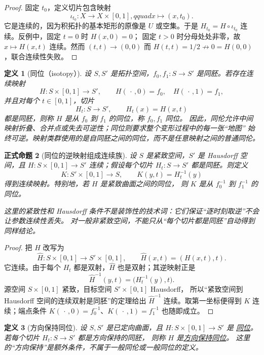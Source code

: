 \documentclass[UTF8,fontset=none,a4paper,11pt]{ctexart}
\theoremstyle{foundation-definition}
\newtheorem{definition}{定义}[section]
\theoremstyle{foundation-theorem}
\theoremstyle{foundation-proposition}
\newtheorem{proposition}[definition]{正式命题}
\theoremstyle{foundation-example}
\theoremstyle{foundation-remark}
\theoremstyle{foundation-theorem}
\newcommand{\term}[2]{\hyperref[#1]{#2}}
\begin{document}
\begin{proof}
固定 $t_0$，定义切片包含映射
\[
\iota_{t_0}:X\to X\times[0,1],qquad x\mapsto(x,t_0).
\]
它是连续的，因为积拓扑的基本矩形的原像是 $U$ 或空集。于是
$H_{t_0}=H\circ\iota_{t_0}$ 连续。反例中，固定 $t=0$ 时 $H(x,0)=0$；
固定 $t>0$ 时分母处处非零，故 $x\mapsto H(x,t)$ 连续。然而
$(t,t)\to(0,0)$ 而 $H(t,t)=1/2\not\to0=H(0,0)$，联合连续性失败。
\end{proof}

\begin{definition}[同位（isotopy）]\label{def:isotopy}
设 \(S,S'\) 是拓扑空间，\(f_0,f_1:S\to S'\) 是同胚。若存在连续映射
\[
H:S\times[0,1]\to S',
\qquad H(\,\cdot\,,0)=f_0,\quad H(\,\cdot\,,1)=f_1,
\]
并且对每个 \(t\in[0,1]\)，切片
\[
H_t:S\to S',\qquad H_t(x)=H(x,t)
\]
都是同胚，则称 \(H\) 是从 \(f_0\) 到 \(f_1\) 的同位，称 \(f_0,f_1\) 同位。
因此，同伦允许中间映射折叠、合并点或失去可逆性；同位则要求整个变形过程中的每一张“地图”
始终可逆。映射类群使用的是自同胚之间的同位，而不是任意映射之间的普通同伦。
\end{definition}

\begin{proposition}[同位的逆映射组成连续族]\label{prop:isotopy-inverse-family}
设 \(S\) 是紧致空间，\(S'\) 是 Hausdorff 空间，且
\(H:S\times[0,1]\to S'\) 连续；假设每个切片
\(H_t:S\to S'\) 都是同胚。则定义
\[
K:S'\times[0,1]\longrightarrow S,
\qquad K(y,t)=H_t^{-1}(y)
\]
得到连续映射。特别地，若 \(H\) 是紧致曲面之间的同位，
则 \(K\) 是从 \(f_0^{-1}\) 到 \(f_1^{-1}\) 的同位。

这里的紧致性和 Hausdorff 条件不是装饰性的技术词：它们保证“逐时刻取逆”不会让参数连续性丢失。
对一般非紧致空间，不能只从“每个切片都是同胚”自动得到同样结论。
\end{proposition}

\begin{proof}
把 \(H\) 改写为
\[
\widehat H:S\times[0,1]\longrightarrow S'\times[0,1],
\qquad \widehat H(x,t)=(H(x,t),t).
\]
它连续。由于每个 \(H_t\) 都是双射，\(\widehat H\) 也是双射；其逆映射正是
\[
\widehat H^{-1}(y,t)=\bigl(H_t^{-1}(y),t\bigr).
\]
源空间 \(S\times[0,1]\) 紧致，目标空间 \(S'\times[0,1]\) Hausdorff，
所以“紧致空间到 Hausdorff 空间的连续双射是同胚”的定理给出
\(\widehat H^{-1}\) 连续。取第一坐标便得到 \(K\) 连续；端点条件
\(K(\,\cdot\,,0)=f_0^{-1}\)、\(K(\,\cdot\,,1)=f_1^{-1}\) 也随即成立。
\end{proof}

\begin{definition}[方向保持同位]\label{def:orientation-preserving-isotopy}
设 \(S,S'\) 是已定向曲面，且 \(H:S\times[0,1]\to S'\) 是
\term{def:isotopy}{同位}。若每个切片 \(H_t:S\to S'\) 都是方向保持的同胚，
则称 \(H\) 是\term{def:orientation-preserving-isotopy}{方向保持同位}。
这里的“方向保持”是额外条件，不属于一般同伦或一般同位的定义。
\end{definition}
\end{document}
